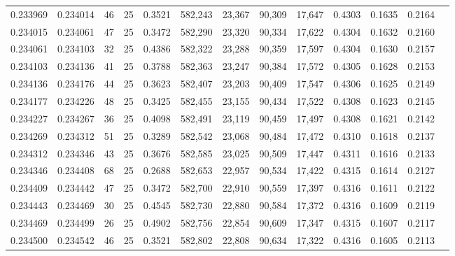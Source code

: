 \begin{tabular}{rrrrrrrrrrrrr}
0.233969 & 0.234014 &    46 &  25 &                                     0.3521 & 582,243 &  23,367 &  90,309 &  17,647 & 0.4303 & 0.1635 & 0.2164 \\
0.234015 & 0.234061 &    47 &  25 &                                     0.3472 & 582,290 &  23,320 &  90,334 &  17,622 & 0.4304 & 0.1632 & 0.2160 \\
0.234061 & 0.234103 &    32 &  25 &                                     0.4386 & 582,322 &  23,288 &  90,359 &  17,597 & 0.4304 & 0.1630 & 0.2157 \\
0.234103 & 0.234136 &    41 &  25 &                                     0.3788 & 582,363 &  23,247 &  90,384 &  17,572 & 0.4305 & 0.1628 & 0.2153 \\
0.234136 & 0.234176 &    44 &  25 &                                     0.3623 & 582,407 &  23,203 &  90,409 &  17,547 & 0.4306 & 0.1625 & 0.2149 \\
0.234177 & 0.234226 &    48 &  25 &                                     0.3425 & 582,455 &  23,155 &  90,434 &  17,522 & 0.4308 & 0.1623 & 0.2145 \\
0.234227 & 0.234267 &    36 &  25 &                                     0.4098 & 582,491 &  23,119 &  90,459 &  17,497 & 0.4308 & 0.1621 & 0.2142 \\
0.234269 & 0.234312 &    51 &  25 &                                     0.3289 & 582,542 &  23,068 &  90,484 &  17,472 & 0.4310 & 0.1618 & 0.2137 \\
0.234312 & 0.234346 &    43 &  25 &                                     0.3676 & 582,585 &  23,025 &  90,509 &  17,447 & 0.4311 & 0.1616 & 0.2133 \\
0.234346 & 0.234408 &    68 &  25 &                                     0.2688 & 582,653 &  22,957 &  90,534 &  17,422 & 0.4315 & 0.1614 & 0.2127 \\
0.234409 & 0.234442 &    47 &  25 &                                     0.3472 & 582,700 &  22,910 &  90,559 &  17,397 & 0.4316 & 0.1611 & 0.2122 \\
0.234443 & 0.234469 &    30 &  25 &                                     0.4545 & 582,730 &  22,880 &  90,584 &  17,372 & 0.4316 & 0.1609 & 0.2119 \\
0.234469 & 0.234499 &    26 &  25 &                                     0.4902 & 582,756 &  22,854 &  90,609 &  17,347 & 0.4315 & 0.1607 & 0.2117 \\
0.234500 & 0.234542 &    46 &  25 &                                     0.3521 & 582,802 &  22,808 &  90,634 &  17,322 & 0.4316 & 0.1605 & 0.2113 \\

\end{tabular}
